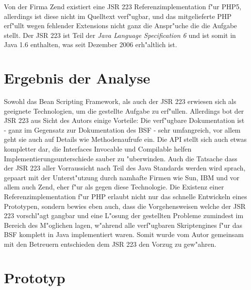 Von der Firma Zend existiert eine JSR 223 Referenzimplementation f"ur PHP5, allerdings ist diese nicht im Quelltext verf"ugbar,
und das mitgelieferte PHP erf"ullt wegen fehlender Extensions nicht ganz die Anspr"uche die die Aufgabe stellt.
Der JSR 223 ist Teil der \emph{Java Language Specification 6} und ist somit in Java 1.6 enthalten, was seit Dezember 2006 erh"altlich ist.

\section{Ergebnis der Analyse}
\label{sec:javanscripts:fazit}

Sowohl das Bean Scripting Framework, als auch der JSR 223 erwiesen sich als geeignete Technologien, um die gestellte Aufgabe zu 
erf"ullen. Allerdings bot der JSR 223 aus Sicht des Autors einige Vorteile: 
Die verf"ugbare Dokumentation ist - ganz im Gegensatz zur Dokumentation des BSF - sehr umfangreich, vor allem geht sie auch
auf Details wie Methodenaufrufe ein. Die API stellt sich auch etwas kompletter dar, die Interfaces Invocable und Compilable 
helfen Implementierungsunterschiede sauber zu "uberwinden. Auch die Tatsache dass der JSR 223 aller Vorraussicht nach Teil
des Java Standards werden wird sprach, gepaart mit der Unterst"utzung durch namhafte Firmen wie Sun, IBM und vor allem auch 
Zend, eher f"ur als gegen diese Technologie. Die Existenz einer Referenzimplementation f"ur PHP erlaubt nicht nur das
schnelle Entwickeln eines Prototypen, sondern bewies eben auch, dass die Vorgehensweisen welche der JSR 223 vorschl"agt 
gangbar und eine L"osung der gestellten Probleme zumindest im Bereich des M"oglichen lagen, w"ahrend alle verf"ugbaren
Skriptengines f"ur das BSF komplett in Java implementiert waren.
Somit wurde vom Autor gemeinsam mit den Betreuern entschieden dem JSR 223 den Vorzug zu gew"ahren.

\section{Prototyp}
\label{sec:javanscripts:prototype}

